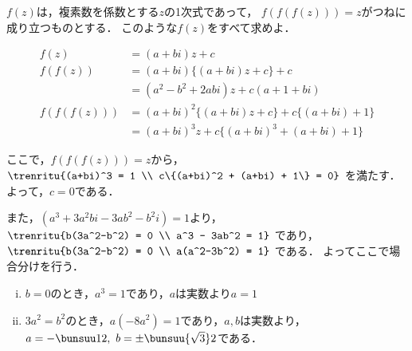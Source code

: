 \begin{problem}
$f(z)$は，複素数を係数とする$z$の1次式であって，
$f(f(f(z)))=z$がつねに成り立つものとする．
このような$f(z)$をすべて求めよ．
\end{problem}



\begin{align*}
  f(z) &= (a+bi)z + c \\
  f(f(z)) &= (a+bi)\{(a+bi)z + c\} + c \\
  &= (a^2 - b^2 + 2abi)z + c(a + 1 + bi) \\
  f(f(f(z))) &= (a+bi)^2\{(a+bi)z + c\} + c\{(a+bi) + 1\} \\
  &= (a+bi)^3 z + c\{(a+bi)^3 + (a+bi) + 1\}
\end{align*}

ここで，$f(f(f(z))) = z$から，
$\trenritu{(a+bi)^3 = 1 \\ c\{(a+bi)^2 + (a+bi) + 1\} = 0}$
を満たす．よって，$c=0$である．

また，$(a^3+3a^2bi - 3ab^2 - b^2i) = 1$より，
$\trenritu{b(3a^2-b^2) = 0 \\ a^3 - 3ab^2 = 1}$ であり，
$\trenritu{b(3a^2-b^2) = 0 \\ a(a^2-3b^2) = 1}$ である．
よってここで場合分けを行う．

\begin{enumerate}[(i)]
  \item $b=0$のとき，$a^3 = 1$であり，$a$は実数より$a=1$
  \item $3a^2 = b^2$のとき，$a(-8a^2) = 1$であり，$a,b$は実数より，
  $a = -\bunsuu12,\ b=\pm \bunsuu{\sqrt{3}}2$である．
\end{enumerate}


